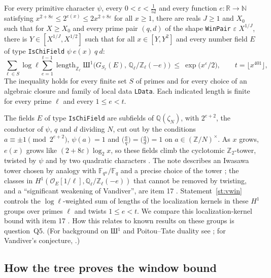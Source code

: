 \begin{statement}\label{st:vwin}
For every primitive character $\psi$, every $0<\varepsilon<\frac1{52}$ and every function
$e:\mathbb R\to\mathbb N$ satisfying $x^{2+8\varepsilon}\le 2^{e(x)}\le 2x^{2+8\varepsilon}$ for all
$x\ge1$, there are reals $J\ge1$ and $X_0$ such that for $X\ge X_0$ and every prime pair $(q,d)$ of the shape \texttt{WinPair}
$\varepsilon$ $X^{1/J}$, there is $Y\in[X^{1/J},X^{1/2}]$ such that for all $x\in[Y,Y^2]$ and every
number field $E$ of type \texttt{IsChiField} $\psi\ e(x)\ q\ d$:
\[
\sum_{\ell\in S}\log\ell\sum_{e=1}^{t-1}\operatorname{length}_{\mathbb Z_\ell}
\text{Ш}^1\bigl(G_{S_\ell}(E),\,\mathbb Q_\ell/\mathbb Z_\ell(-e)\bigr)\ \le\ \exp\bigl(x^{\varepsilon}/2\bigr),
\qquad t=\lfloor x^{401}\rfloor,
\]
The inequality holds for every finite set $S$ of primes and for every choice of an algebraic
closure and family of local data \texttt{LData}. Each indicated length is finite for every prime
$\ell$ and every $1\le e<t$.
\end{statement}

The fields $E$ of type \texttt{IsChiField} are subfields of $\mathbb Q(\zeta_N)$, with $2^{e+2}$, the
conductor of $\psi$, $q$ and $d$ dividing $N$, cut out by the conditions $a\equiv\pm1\pmod{2^{e+2}}$,
$\psi(a)=1$ and $\bigl(\frac aq\bigr)=\bigl(\frac ad\bigr)=1$ on $a\in(\mathbb Z/N)^\times$. As $x$
grows, $e(x)$ grows like $(2+8\varepsilon)\log_2 x$, so these fields climb the cyclotomic
$\mathbb Z_2$-tower, twisted by $\psi$ and by two quadratic characters \sti. The note describes an
Iwasawa tower chosen by analogy with $\mathbb F_{q^n}/\mathbb F_q$  and a precise choice of
the tower ; the classes in $H^1(\mathcal O_E[1/\ell],\mathbb Q_\ell/\mathbb Z_\ell(-e))$ that
cannot be removed by twisting, and a ``significant weakening of Vandiver'', are item 17 .
Statement~\ref{st:vwin} controls the $\log\ell$-weighted sum of lengths of the localization kernels
in these $H^1$ groups over primes $\ell$ and twists $1\le e<t$. We compare this localization-kernel
bound with item 17 \sti. How this relates to known results on these groups is question~Q5. (For background on Ш$^1$ and
Poitou--Tate duality see \cite[Ch.~VIII]{nsw}; for Vandiver's conjecture, \cite[§8.3]{washington}.)

\subsection{How the tree proves the window bound}

